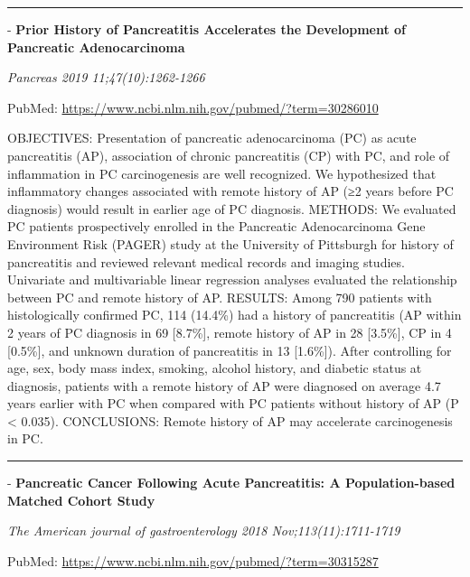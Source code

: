 \documentclass[]{article}
\begin{document}
\begin{center}\rule{0.5\linewidth}{\linethickness}\end{center}

 - \textbf{Prior History of Pancreatitis Accelerates the Development of
Pancreatic Adenocarcinoma}

\emph{Pancreas 2019 11;47(10):1262-1266}

PubMed: \url{https://www.ncbi.nlm.nih.gov/pubmed/?term=30286010}

OBJECTIVES: Presentation of pancreatic adenocarcinoma (PC) as acute
pancreatitis (AP), association of chronic pancreatitis (CP) with PC, and
role of inflammation in PC carcinogenesis are well recognized. We
hypothesized that inflammatory changes associated with remote history of
AP (≥2 years before PC diagnosis) would result in earlier age of PC
diagnosis. METHODS: We evaluated PC patients prospectively enrolled in
the Pancreatic Adenocarcinoma Gene Environment Risk (PAGER) study at the
University of Pittsburgh for history of pancreatitis and reviewed
relevant medical records and imaging studies. Univariate and
multivariable linear regression analyses evaluated the relationship
between PC and remote history of AP. RESULTS: Among 790 patients with
histologically confirmed PC, 114 (14.4\%) had a history of pancreatitis
(AP within 2 years of PC diagnosis in 69 {[}8.7\%{]}, remote history of
AP in 28 {[}3.5\%{]}, CP in 4 {[}0.5\%{]}, and unknown duration of
pancreatitis in 13 {[}1.6\%{]}). After controlling for age, sex, body
mass index, smoking, alcohol history, and diabetic status at diagnosis,
patients with a remote history of AP were diagnosed on average 4.7 years
earlier with PC when compared with PC patients without history of AP (P
\textless{} 0.035). CONCLUSIONS: Remote history of AP may accelerate
carcinogenesis in PC.

{}

{}

\begin{center}\rule{0.5\linewidth}{\linethickness}\end{center}

 - \textbf{Pancreatic Cancer Following Acute Pancreatitis: A
Population-based Matched Cohort Study}

\emph{The American journal of gastroenterology 2018
Nov;113(11):1711-1719}

PubMed: \url{https://www.ncbi.nlm.nih.gov/pubmed/?term=30315287}
\end{document}
